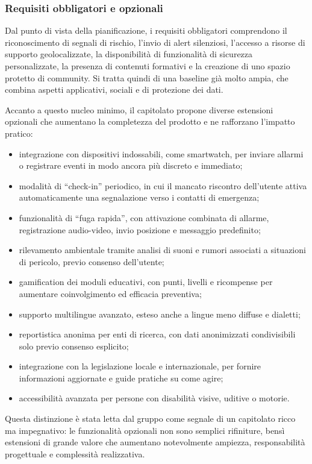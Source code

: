 \documentclass[a4paper,12pt]{article}
\begin{document}
\subsubsection{Requisiti obbligatori e opzionali}

Dal punto di vista della pianificazione, i requisiti obbligatori comprendono il riconoscimento di segnali di rischio, l'invio di alert silenziosi, l'accesso a risorse di supporto geolocalizzate, la disponibilità di funzionalità di sicurezza personalizzate, la presenza di contenuti formativi e la creazione di uno spazio protetto di community. Si tratta quindi di una baseline già molto ampia, che combina aspetti applicativi, sociali e di protezione dei dati.

Accanto a questo nucleo minimo, il capitolato propone diverse estensioni opzionali che aumentano la completezza del prodotto e ne rafforzano l'impatto pratico:
\begin{itemize}
    \item integrazione con dispositivi indossabili, come smartwatch, per inviare allarmi o registrare eventi in modo ancora più discreto e immediato;
    \item modalità di ``check-in'' periodico, in cui il mancato riscontro dell'utente attiva automaticamente una segnalazione verso i contatti di emergenza;
    \item funzionalità di ``fuga rapida'', con attivazione combinata di allarme, registrazione audio-video, invio posizione e messaggio predefinito;
    \item rilevamento ambientale tramite analisi di suoni e rumori associati a situazioni di pericolo, previo consenso dell'utente;
    \item gamification dei moduli educativi, con punti, livelli e ricompense per aumentare coinvolgimento ed efficacia preventiva;
    \item supporto multilingue avanzato, esteso anche a lingue meno diffuse e dialetti;
    \item reportistica anonima per enti di ricerca, con dati anonimizzati condivisibili solo previo consenso esplicito;
    \item integrazione con la legislazione locale e internazionale, per fornire informazioni aggiornate e guide pratiche su come agire;
    \item accessibilità avanzata per persone con disabilità visive, uditive o motorie.
\end{itemize}

Questa distinzione è stata letta dal gruppo come segnale di un capitolato ricco ma impegnativo: le funzionalità opzionali non sono semplici rifiniture, bensì estensioni di grande valore che aumentano notevolmente ampiezza, responsabilità progettuale e complessità realizzativa.
\end{document}
